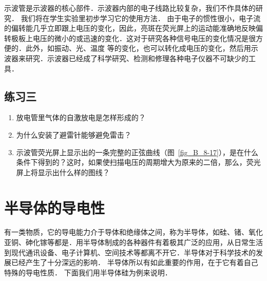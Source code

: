 示波管是示波器的核心部件．示波器内部的电子线路比较复杂，我们不作具体的研究．
我们将在学生实验里初步学习它的使用方法．
由于电子的惯性很小，电子流的偏转能几乎立即跟上电压的变化，因此，亮斑在荧光屏上的运动能准确地反映偏转极板上电压的微小的或迅速的变化．这对于研究各种信号电压的变化情况是很方便的．此外，如振动、光、温度
等的变化，也可以转化成电压的变化，然后用示波器来研究．示波器已经成了科学研究、检测和修理各种电子仪器不可缺少的工具．


\subsection*{练习三}
\begin{enumerate}
    \item 放电管里气体的自激放电是怎样形成的？
    \item 为什么安装了避雷针能够避免雷击？
    \item 示波管荧光屏上显示出的一条完整的正弦曲线（图~\ref{fig_B_8-17}），是在什么条件下得到的？这时，如果使扫描电压的周期增大为原来的二倍，那么，荧光屏上将显示出什么样的图线？
\end{enumerate}


\section{半导体的导电性}
有一类物质，它的导电能力介于导体和绝缘体之间，称为半导体，如硅、锗、氧化亚铜、砷化镓等都是．用半导体制成的各种器件有着极其广泛的应用，从日常生活到现代通讯设备、电子计算机、空间技术等都离不开它．半导体对于科学技术的发展已经产生了十分深远的影响．
半导体所以有如此重要的作用，在于它有着自己特殊的导电性质．
下面我们用半导体硅为例来说明．

